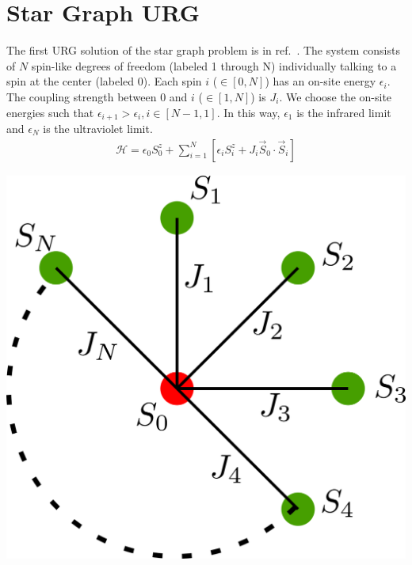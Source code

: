 \documentclass[twoside]{report}
\numberwithin{equation}{section}
\begin{document}
\section{Star Graph URG}
\begin{minipage}{260pt}
	The first URG solution of the star graph problem is in ref.~\cite{spa_star}. The system consists of \(N\) spin-like degrees of freedom (labeled 1 through N) individually talking to a spin at the center (labeled 0). Each spin \(i\) (\(\in \left[0,N\right]\)) has an on-site energy \(\epsilon_i\). The coupling strength between 0 and \(i\) (\(\in \left[1,N\right]\)) is \(J_i\). We choose the on-site energies such that \(\epsilon_{i+1} > \epsilon_i, i\in\left[N-1,1\right]\). In this way, \(\epsilon_1\) is the infrared limit and \(\epsilon_N\) is the ultraviolet limit.
\begin{equation}\begin{aligned}
	\mathcal{H} = \epsilon_0 S^z_0 + \sum_{i=1}^N\left[\epsilon_i S^z_i + J_i \vec{S}_0 \cdot \vec{S}_i\right]
\end{aligned}\end{equation}
\end{minipage}
\hspace*{20pt}
\begin{minipage}{200pt}
\begin{center}
\includegraphics[scale=0.2]{../figures/stargraph_.png}
\end{center}
\end{minipage}
\end{document}
